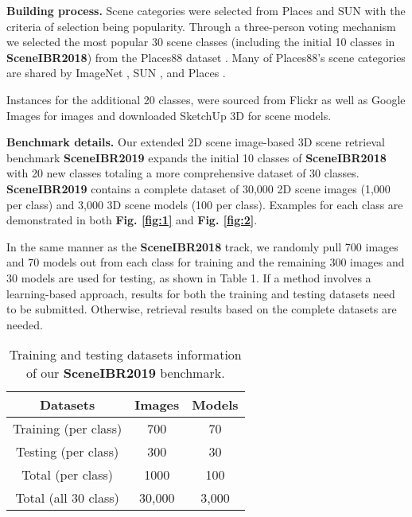 \documentclass[../main.tex]{subfiles}
\begin{document}
\textbf{Building process.} 
Scene categories were selected from  Places \cite{zhou2017places} and SUN \cite{SUN} with the criteria of selection being popularity. Through a three-person voting mechanism we selected the most popular 30 scene classes (including the initial 10 classes in \textbf{SceneIBR2018}) from the Places88 dataset \cite{Places88}. Many of Places88's scene categories are shared by ImageNet \cite{ImageNet}, SUN \cite{SUN}, and Places \cite{zhou2017places}. 

Instances for the additional 20 classes, were sourced from Flickr \cite{Flickr} as well as Google Images\cite{GoogleImages} for images and downloaded SketchUp 3D \cite{3DWarehouse} for scene models. 

\textbf{Benchmark details.} Our extended 2D scene image-based 3D scene retrieval benchmark \textbf{SceneIBR2019} expands the initial 10 classes of \textbf{SceneIBR2018} with 20 new classes totaling a more comprehensive dataset of 30 classes. \textbf{SceneIBR2019} contains a complete dataset of 30,000 2D scene images (1,000 per class) and 3,000 3D scene models (100 per class). Examples for each class are demonstrated in both \textbf{Fig. \ref{fig:1}} and \textbf{Fig. \ref{fig:2}}.

In the same manner as the \textbf{SceneIBR2018} track, we randomly pull 700 images and 70 models out from each class for training and the remaining 300 images and 30 models are used for testing, as shown in Table 1. If a method involves a learning-based approach, results for both the training and testing datasets need to be submitted. Otherwise, retrieval results based on the complete datasets are needed.


\begin{table}[h]
	\centering
	\caption{Training and testing datasets information of our \textbf{SceneIBR2019} benchmark.}
	\begin{center}
		\begin{tabular}  {|c|c|c|}
			\hline
			\textbf{\normalsize{Datasets}} & \textbf{\normalsize{Images}} & \textbf{\normalsize{Models}}\\
			\hline
			\normalsize{Training (per class)}  & 700  & 70  \\
			\hline
			\normalsize{Testing (per class)}  & 300  & 30  \\
			\hline
			\normalsize{Total (per class)}  & 1000  & 100  \\
			\hline
			\normalsize{Total (all 30 class)}  & 30,000  & 3,000  \\
			\hline
		\end{tabular}
	\end{center}
	\label{table1}
\end{table}
\end{document}
